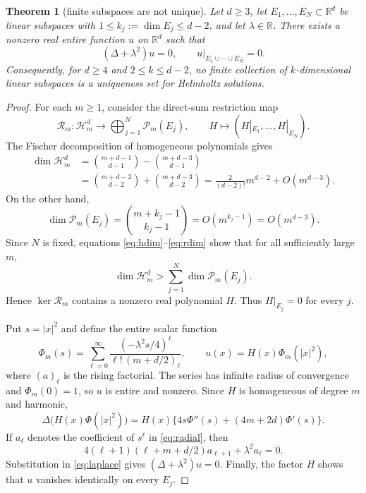 \documentclass[11pt]{article}
\newtheorem{theorem}{Theorem}
\newcommand{\R}{\mathbb R}
\newcommand{\Harm}{\mathcal H}
\newcommand{\Poly}{\mathcal P}
\begin{document}
\begin{theorem}[finite subspaces are not unique]\label{thm:main}
Let $d\geq3$, let $E_1,\ldots,E_N\subset\R^d$ be linear subspaces with
$1\leq k_j:=\dim E_j\leq d-2$, and let $\lambda\in\R$.  There exists a
nonzero real entire function $u$ on $\R^d$ such that
\[
 (\Delta+\lambda^2)u=0,
 \qquad
 u|_{E_1\cup\cdots\cup E_N}=0.
\]
Consequently, for $d\geq4$ and $2\leq k\leq d-2$, no finite collection of
$k$-dimensional linear subspaces is a uniqueness set for Helmholtz
solutions.
\end{theorem}

\begin{proof}
For each $m\geq1$, consider the direct-sum restriction map
\[
 \mathcal R_m:\Harm_m^d\longrightarrow
       \bigoplus_{j=1}^N\Poly_m(E_j),
 \qquad H\longmapsto(H|_{E_1},\ldots,H|_{E_N}).
\]
The Fischer decomposition of homogeneous polynomials gives
\begin{align}
 \dim\Harm_m^d
 &=\binom{m+d-1}{d-1}-\binom{m+d-3}{d-1}\label{eq:hdim}\\
 &=\binom{m+d-2}{d-2}+\binom{m+d-3}{d-2}
   =\frac{2}{(d-2)!}m^{d-2}+O(m^{d-3}).\nonumber
\end{align}
On the other hand,
\begin{equation}\label{eq:rdim}
 \dim\Poly_m(E_j)=\binom{m+k_j-1}{k_j-1}=O(m^{k_j-1})
 =O(m^{d-3}).
\end{equation}
Since $N$ is fixed, equations \eqref{eq:hdim}--\eqref{eq:rdim} show that
for all sufficiently large $m$,
\[
 \dim\Harm_m^d>
 \sum_{j=1}^N\dim\Poly_m(E_j).
\]
Hence $\ker\mathcal R_m$ contains a nonzero real polynomial $H$.  Thus
$H|_{E_j}=0$ for every $j$.

Put $s=|x|^2$ and define the entire scalar function
\begin{equation}\label{eq:radial}
 \Phi_m(s)=\sum_{\ell=0}^{\infty}
 \frac{(-\lambda^2s/4)^\ell}{\ell!\,(m+d/2)_\ell},
 \qquad u(x)=H(x)\Phi_m(|x|^2),
\end{equation}
where $(a)_\ell$ is the rising factorial.  The series has infinite radius
of convergence and $\Phi_m(0)=1$, so $u$ is entire and nonzero.  Since $H$
is homogeneous of degree $m$ and harmonic,
\begin{equation}\label{eq:laplace}
 \Delta\bigl(H(x)\Phi(|x|^2)\bigr)
 =H(x)\{4s\Phi''(s)+(4m+2d)\Phi'(s)\}.
\end{equation}
If $a_\ell$ denotes the coefficient of $s^\ell$ in \eqref{eq:radial},
then
\[
 4(\ell+1)(\ell+m+d/2)a_{\ell+1}+\lambda^2a_\ell=0.
\]
Substitution in \eqref{eq:laplace} gives
$(\Delta+\lambda^2)u=0$.  Finally, the factor $H$ shows that $u$ vanishes
identically on every $E_j$.
\end{proof}
\end{document}

